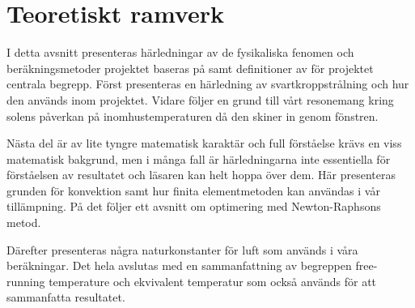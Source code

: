 \chapter{Teoretiskt ramverk}

I detta avsnitt presenteras härledningar av de fysikaliska fenomen och beräkningsmetoder projektet baseras på samt definitioner av för projektet centrala begrepp. Först presenteras en härledning av svartkroppstrålning och hur den används inom projektet. Vidare följer en grund till vårt resonemang kring solens påverkan på inomhustemperaturen då den skiner in genom fönstren.

Nästa del är av lite tyngre matematisk karaktär och full förståelse krävs en viss matematisk bakgrund, men i många fall är härledningarna inte essentiella för förståelsen av resultatet och läsaren kan helt hoppa över dem. Här presenteras grunden för konvektion samt hur finita elementmetoden kan användas i vår tillämpning. På det följer ett avsnitt om optimering med Newton-Raphsons metod. 

Därefter presenteras några naturkonstanter för luft som används i våra beräkningar. Det hela avslutas med en sammanfattning av begreppen free-running temperature och ekvivalent temperatur som också används för att sammanfatta resultatet.













